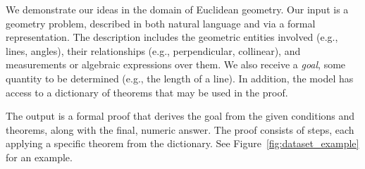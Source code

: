 




We demonstrate our ideas in the domain of Euclidean geometry. Our input is a geometry problem, described in both natural language and via a formal representation. The description includes the geometric entities involved (e.g., lines, angles), their relationships (e.g., perpendicular, collinear),
and measurements or algebraic expressions over them. We also receive a \emph{goal}, some quantity to be determined (e.g., the length of a line). In addition, the model has access to a dictionary of theorems that may be used in the proof.

The output is a formal proof that derives the goal from the given conditions and theorems, along with the final, numeric answer. The proof consists of steps, each applying a specific theorem from the dictionary. See Figure~\ref{fig:dataset_example} for an example.



